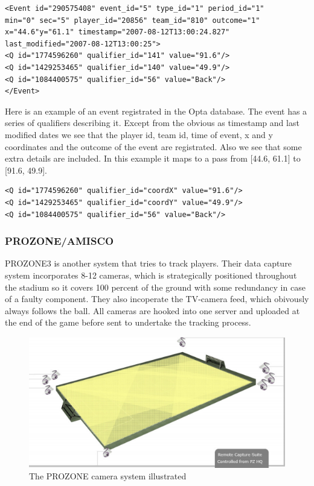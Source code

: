 \begin{lstlisting}
<Event id="290575408" event_id="5" type_id="1" period_id="1" 
min="0" sec="5" player_id="20856" team_id="810" outcome="1" 
x="44.6"y="61.1" timestamp="2007-08-12T13:00:24.827" 
last_modified="2007-08-12T13:00:25">
<Q id="1774596260" qualifier_id="141" value="91.6"/>
<Q id="1429253465" qualifier_id="140" value="49.9"/>
<Q id="1084400575" qualifier_id="56" value="Back"/>
</Event>
\end{lstlisting}

Here is an example of an event registrated in the Opta database. The event has a series of qualifiers describing it. Except from the obvious as timestamp and last modified dates we see that the player id, team id, time of event, x and y coordinates and the outcome of the event are registrated. Also we see that some extra details are included. In this example it maps to a pass from [44.6, 61.1] to [91.6, 49.9].

\begin{lstlisting}
<Q id="1774596260" qualifier_id="coordX" value="91.6"/>
<Q id="1429253465" qualifier_id="coordY" value="49.9"/>
<Q id="1084400575" qualifier_id="56" value="Back"/>
\end{lstlisting}


\subsubsection{PROZONE/AMISCO}
PROZONE3  is another system that tries to track players. Their data capture system incorporates 8-12 cameras, which is strategically positioned throughout the stadium so it covers 100 percent of the ground with some redundancy in case of a faulty component. They also incoperate the TV-camera feed, which obivously always follows the ball. All cameras are hooked into one server and uploaded at the end of the game before sent to undertake the tracking process. 

\begin{figure}[ht!]
\centering
\includegraphics[width=150mm]{images/general/prozonecam.png}
\caption{The PROZONE camera system illustrated}
\label{overflow}
\end{figure}

